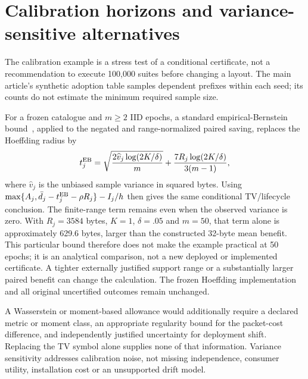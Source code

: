 \section{Calibration horizons and variance-sensitive alternatives}
The calibration example is a stress test of a conditional certificate,
not a recommendation to execute 100,000 suites before changing a layout.
The main article's synthetic adoption table samples dependent prefixes
within each seed; its counts do not estimate the minimum required sample size.

For a frozen catalogue and $m\ge2$ IID epochs, a standard empirical-Bernstein
bound~\cite{maurerpontil}, applied to the negated and range-normalized
paired saving, replaces the Hoeffding radius by
\[
t^{\rm EB}_j=\sqrt{\frac{2\widehat v_j\log(2K/\delta)}m}
             +\frac{7R_j\log(2K/\delta)}{3(m-1)},
\]
where $\widehat v_j$ is the unbiased sample variance in squared bytes.
Using $\max\{A_j,\bar d_j-t^{\rm EB}_j-\rho R_j\}-I_j/h$ then gives
the same conditional TV/lifecycle conclusion. The finite-range term
remains even when the observed variance is zero. With $R_j=3584$ bytes,
$K=1$, $\delta=.05$ and $m=50$, that term alone is approximately
629.6 bytes, larger than the constructed 32-byte mean benefit. This
particular bound therefore does not make the example practical at 50 epochs;
it is an analytical comparison, not a new deployed or implemented certificate.
A tighter externally justified support range or a substantially larger
paired benefit can change the calculation. The frozen Hoeffding implementation
and all original uncertified outcomes remain unchanged.

A Wasserstein or moment-based allowance would additionally require a
declared metric or moment class, an appropriate regularity bound for the
packet-cost difference, and independently justified uncertainty for deployment
shift. Replacing the TV symbol alone supplies none of that information.
Variance sensitivity addresses calibration noise, not missing independence,
consumer utility, installation cost or an unsupported drift model.
